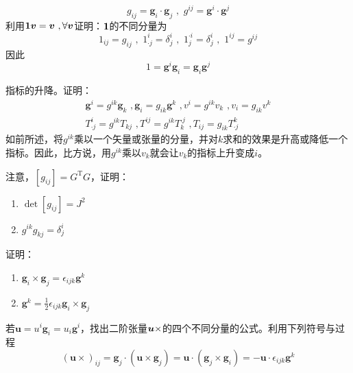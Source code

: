 \begin{exercise}
\begin{equation*}
        g_{ij}=\boldsymbol{g}_i\cdot \boldsymbol{g}_j\,\, , \,\,  g^{ij}=\boldsymbol{g}^i\cdot \boldsymbol{g}^j
    \end{equation*}
    利用$\bf{1}\boldsymbol{v}=\boldsymbol{v}\,\, ,\forall \boldsymbol{v}$证明：$\bf{1}$的不同分量为
    \begin{equation*}
        1_{ij}=g_{ij}\,\, , \,\,  1_{\cdot j}^{i}=\delta _{j}^{i}\,\, , \,\,  1_{j}^{\cdot i}=\delta _{j}^{i}\,\, , \,\,  1^{ij}=g^{ij}
    \end{equation*}
    因此
    \begin{equation*}
        1=\boldsymbol{g}^i\boldsymbol{g}_i=\boldsymbol{g}_i\boldsymbol{g}^j
    \end{equation*}
    \item 指标的升降。证明：
    \begin{equation*}
        \begin{array}{c}
            \boldsymbol{g}^i=g^{ik}\boldsymbol{g}_k\,\, ,  \boldsymbol{g}_i=g_{ik}\boldsymbol{g}^k\,\, ,  v^i=g^{ik}v_k\,\, ,  v_i=g_{ik}v^k\\
            T_{\cdot j}^{i}=g^{ik}T_{kj}\,\, ,  T^{ij}=g^{ik}T_{k}^{\cdot j}\,\, ,  T_{ij}=g_{ik}T_{\cdot j}^{k}
        \end{array}
    \end{equation*}
    如前所述，将$g^{ik}$乘以一个矢量或张量的分量，并对$k$求和的效果是升高或降低一个指标。因此，比方说，用$g^{ik}$乘以$v_k$就会让$v_k$的指标上升变成$i$。
    \item 注意，$\left[ g_{ij} \right] =G^{\mathrm{T}}G$，证明：
    \begin{enumerate}
        \item $\det \left[ g_{ij} \right] =J^2$
        \item $g^{ik}g_{kj}=\delta _{j}^{i}$
    \end{enumerate}
    \item 证明：
    \begin{enumerate}
        \item $\boldsymbol{g}_i\times \boldsymbol{g}_j=\epsilon _{ijk}\boldsymbol{g}^k$
        \item $\boldsymbol{g}^k=\frac{1}{2}\epsilon _{ijk}\boldsymbol{g}_i\times \boldsymbol{g}_j$
    \end{enumerate}
    \item 若$\boldsymbol{u}=u^i\boldsymbol{g}_i=u_i\boldsymbol{g}^i$，找出二阶张量$\bb{u}\times $的四个不同分量的公式。利用下列符号与过程
    \begin{equation*}
        \left( \boldsymbol{u}\times \right) _{ij}=\boldsymbol{g}_j\cdot \left( \boldsymbol{u}\times \boldsymbol{g}_j \right) =\boldsymbol{u}\cdot \left( \boldsymbol{g}_j\times \boldsymbol{g}_i \right) =-\boldsymbol{u}\cdot \epsilon _{ijk}\boldsymbol{g}^k

\end{equation*}
\end{exercise}
